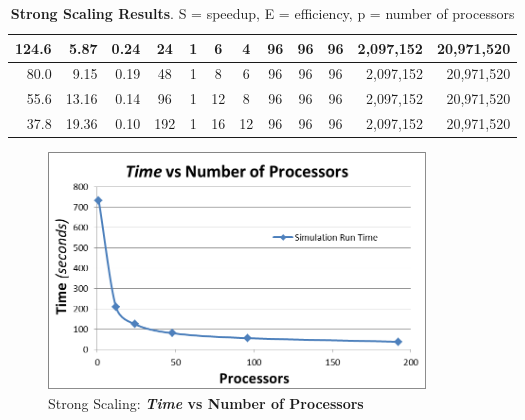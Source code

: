 \documentclass[]{article}
\begin{document}
\begin{table}[h!]
\begin{tabular}{|r|r|r|c|c|c|c|c|c|c|r|r|}
124.6                                                & 5.87                                             & 0.24                                             & 24                          & 1           & 6           & 4           & 96           & 96           & 96          & 2,097,152                                                & 20,971,520                                                   \\ \hline
80.0                                                 & 9.15                                             & 0.19                                             & 48                          & 1           & 8           & 6           & 96           & 96           & 96          & 2,097,152                                                & 20,971,520                                                   \\ \hline
55.6                                                  & 13.16                                              & 0.14                                              & 96                          & 1           & 12          & 8           & 96           & 96           & 96          & 2,097,152                                                & 20,971,520                                                   \\ \hline
37.8                                                  & 19.36                                              & 0.10                                              & 192                         & 1           & 16          & 12          & 96           & 96           & 96          & 2,097,152                                                & 20,971,520                                                   \\ \hline
\end{tabular}
\caption{\textbf{Strong Scaling Results}. S = speedup, E = efficiency, p = number of processors}
\end{table}


\begin{figure}[h!]
    \centering
    \includegraphics[width=10cm]{strong_times.png}
    \caption{Strong Scaling: \textbf{\textit{Time} vs Number of Processors}}
\end{figure}
\end{document}
